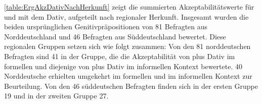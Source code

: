\autoref{table:ErgAkzDativNachHerkunft} zeigt die summierten Akzeptabilitätswerte für \wegen{} und \waehrend{} mit dem Dativ, aufgeteilt nach regionaler Herkunft. 
Insgesamt wurden die beiden ursprünglichen Genitivpräpositionen von 81 Befragten aus Norddeutschland und 46 Befragten aus Süddeutschland bewertet. 
Diese regionalen Gruppen setzen sich wie folgt zusammen: 
Von den 81 norddeutschen Befragten sind 41 in der Gruppe, die die Akzeptabilität von \wegen{} plus Dativ im formellen und diejenige von \waehrend{} plus Dativ im informellen Kontext bewertete.
40 Norddeutsche erhielten umgekehrt \waehrend{} im formellen und \wegen{} im informellen Kontext zur Beurteilung. 
Von den 46 süddeutschen Befragten finden sich in der ersten Gruppe 19 und in der zweiten Gruppe 27. 

